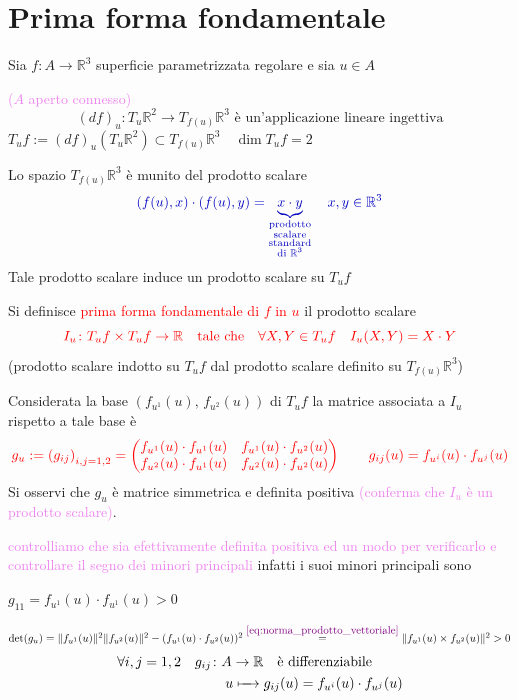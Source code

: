     \section{Prima forma fondamentale}
        \begin{definizione}
        Sia $f \colon A \to \mathbb{R}^3$ superficie parametrizzata regolare e sia $u \in A$ 

        \textcolor{violet}{($A$ aperto connesso)}
        \[ \left(d f \right)_u \colon T_u \mathbb{R}^2 \to T_{f(u)} \mathbb{R}^3 \text{ è un'applicazione lineare ingettiva} \]
        $T_u f := \left(df\right)_u (T_u \mathbb{R}^2) \subset T_{f(u)} \mathbb{R}^3 \quad \dim T_u f = 2$

        \textcolor{blu}{Lo spazio $T_{f(u)} \mathbb{R}^3$ è munito del prodotto scalare }
        \[ \color{blu} \left(f(u) , x \right) \cdot \left(f(u), y\right) = \underbrace{x \cdot y}_{\substack{\text{prodotto} \\ \text{scalare} \\ \text{standard} \\ \text{di } \mathbb{R}^3}} \quad x,y \in \mathbb{R}^3 \]
        \textcolor{blu}{Tale prodotto scalare induce un prodotto scalare su $T_u f$}
        
        Si definisce \textcolor{red}{prima forma fondamentale di $f$ in $u$} il prodotto scalare 
        \[ \color{red} I_u \colon T_u f \times T_u f \to \mathbb{R} \quad \text{tale che} \quad \forall X,Y \in T_u f \quad I_u(X,Y) = X \cdot Y \]
        \textcolor{blu}{(prodotto scalare indotto su $T_u f$ dal prodotto scalare definito su $T_{f(u)} \mathbb{R}^3$)} 

        Considerata la base $\left(f_{u^1}(u), \, f_{u^2}(u)\right)$ di $T_u f$ la matrice associata a $I_u$ rispetto a tale base è 
        \[ \color{red} g_u := \left(g_{ij}\right)_{i,j=1,2} = \begin{pmatrix}
            f_{u^1}(u) \cdot f_{u^1}(u) & f_{u^1}(u) \cdot f_{u^2}(u) \\
            f_{u^2}(u) \cdot f_{u^1}(u) & f_{u^2}(u) \cdot f_{u^2}(u)
        \end{pmatrix}  \qquad g_{ij}(u) = f_{u^i}(u) \cdot f_{u^j}(u) \]
        Si osservi che $g_u$ è matrice simmetrica e definita positiva \textcolor{violet}{(conferma che $I_u$ è un prodotto scalare)}.

        \textcolor{violet}{controlliamo che sia efettivamente definita positiva ed un modo per 
        verificarlo e controllare il segno dei minori principali} infatti i suoi minori principali sono 

        $g_{11} = f_{u^1}(u) \cdot f_{u^1}(u) > 0 $ 

        $\det (g_u) = \lVert f_{u^1}(u)\rVert^2 \lVert f_{u^2}(u)\rVert^2 - (f_{u^1}(u) \cdot f_{u^2}(u))^2 \overset{\textcolor{violet}{\eqref{eq:norma_prodotto_vettoriale}}}{=} \| f_{u^1}(u) \times f_{u^2}(u) \|^2 > 0 $
        \[ \begin{aligned} \forall i,j=1,2 \quad
        g_{ij} & \colon A \to \mathbb{R} \quad \text{è differenziabile} \\
         & \quad u \xmapsto{\quad} g_{ij}(u) = f_{u^i}(u) \cdot f_{u^j}(u)
        \end{aligned}  \]
        \end{definizione}
